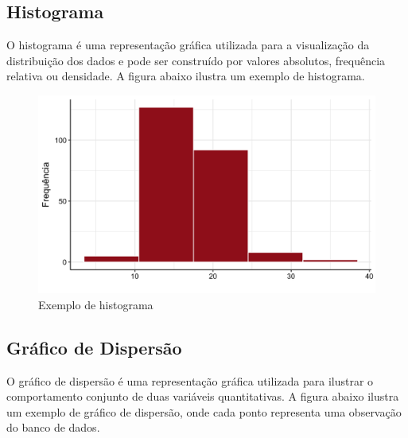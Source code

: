 \documentclass[
]{estat/estat}
\begin{document}
\subsection{Histograma}\label{histograma}

O histograma é uma representação gráfica utilizada para a visualização
da distribuição dos dados e pode ser construído por valores absolutos,
frequência relativa ou densidade. A figura abaixo ilustra um exemplo de
histograma.

\begin{figure}[H]

\caption{Exemplo de histograma}

{\centering \includegraphics[width=158mm,height=\textheight]{images/hist_uni.png}

}

\end{figure}%

\subsection{Gráfico de Dispersão}\label{gruxe1fico-de-dispersuxe3o}

O gráfico de dispersão é uma representação gráfica utilizada para
ilustrar o comportamento conjunto de duas variáveis quantitativas. A
figura abaixo ilustra um exemplo de gráfico de dispersão, onde cada
ponto representa uma observação do banco de dados.
\end{document}
